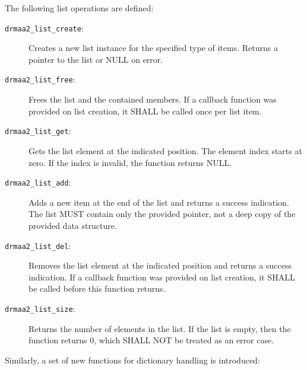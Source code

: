 \documentclass{article}
\newcommand{\h}[1]{\texttt{#1}}
\begin{document}
The following list operations are defined:

\begin{description}
\item[\h{drmaa2\_list\_create}:] Creates a new list instance for the specified type of items. Returns a pointer to the list or NULL on error.
\item[\h{drmaa2\_list\_free}:] Frees the list and the contained members. If a callback function was provided on list creation, it SHALL be called once per list item.
\item[\h{drmaa2\_list\_get}:] Gets the list element at the indicated position. The element index starts at zero. If the index is invalid, the function returns NULL.
\item[\h{drmaa2\_list\_add}:] Adds a new item at the end of the list and returns a success indication. The list MUST contain only the provided pointer, not a deep copy of the provided data structure.
\item[\h{drmaa2\_list\_del}:] Removes the list element at the indicated position and returns a success indication. If a callback function was provided on list creation, it SHALL be called before this function returns.
\item[\h{drmaa2\_list\_size}:] Returns the number of elements in the list. If the list is empty, then the function returns 0, which SHALL NOT be treated as an error case.
\end{description}

Similarly, a set of new functions for dictionary handling is introduced:
\end{document}
